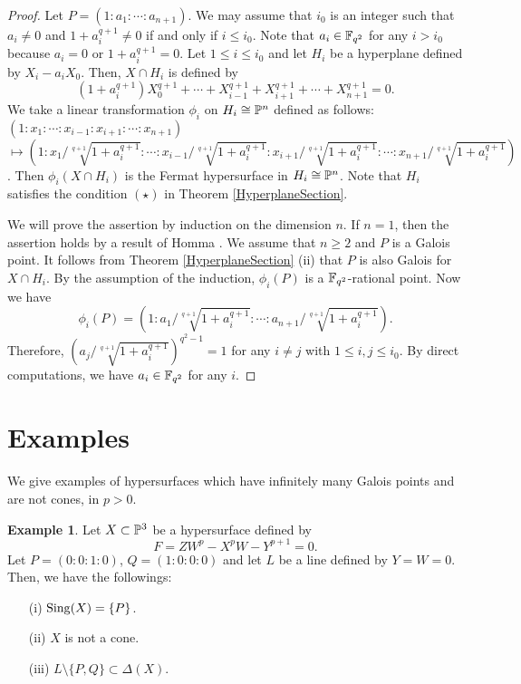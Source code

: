\documentclass[10pt,oneside]{amsart}
\theoremstyle{definition}
\newtheorem{example}{Example}
\begin{document}
\begin{proof}
Let $P=(1:a_1:\cdots:a_{n+1})$. 
We may assume that $i_0$ is an integer such that $a_i \ne 0$ and $1+a_i^{q+1} \ne 0$ if and only if $i \le i_0$. 
Note that $a_i \in \Bbb F_{q^2}$ for any $i > i_0$ because $a_i=0$ or $1+a_i^{q+1}=0$. 
Let $1 \le i \le i_0$ and let $H_i$ be a hyperplane defined by $X_i-a_iX_0$. 
Then, $X \cap H_i$ is defined by 
$$ (1+a_i^{q+1})X_0^{q+1}+\cdots+X_{i-1}^{q+1}+X_{i+1}^{q+1}+\cdots+X_{n+1}^{q+1}=0. $$
We take a linear transformation $\phi_i$ on $H_i \cong \Bbb P^{n}$ defined as follows: 
$(1:x_1:\cdots:x_{i-1}:x_{i+1}:\cdots:x_{n+1})$ 
$\mapsto (1:x_1/\sqrt[q+1]{1+a_i^{q+1}}:\cdots:x_{i-1}/\sqrt[q+1]{1+a_i^{q+1}}:x_{i+1}/\sqrt[q+1]{1+a_i^{q+1}}:\cdots:x_{n+1}/\sqrt[q+1]{1+a_i^{q+1}})$.  
Then $\phi_i(X \cap H_i)$ is the Fermat hypersurface in $H_i \cong \Bbb P^{n}$. 
Note that $H_i$ satisfies the condition $(\star)$ in Theorem \ref{HyperplaneSection}. 

We will prove the assertion by induction on the dimension $n$. 
If $n=1$, then the assertion holds by a result of Homma \cite{homma}. 
We assume that $n \ge 2$ and $P$ is a Galois point. 
It follows from Theorem \ref{HyperplaneSection} (ii) that $P$ is also Galois for $X \cap H_i$. 
By the assumption of the induction, $\phi_i(P)$ is a $\Bbb F_{q^2}$-rational point.  
Now we have 
$$ \phi_i(P)=(1:a_1/\sqrt[q+1]{1+a_i^{q+1}}:\cdots:a_{n+1}/\sqrt[q+1]{1+a_i^{q+1}}).$$ 
Therefore, $(a_j/\sqrt[q+1]{1+a_i^{q+1}})^{q^2-1}=1$ for any $i \ne j$ with $1 \le i, j \le i_0$. 
By direct computations, we have $a_i \in \Bbb F_{q^2}$ for any $i$. 
\end{proof}

\section{Examples} 

We give examples of hypersurfaces which have infinitely many Galois points and are not cones, in $p>0$. 

\begin{example} \label{example1} 
Let $X \subset \Bbb P^3$ be a hypersurface defined by 
$$ F=ZW^p-X^pW-Y^{p+1}=0. $$ 
Let $P=(0:0:1:0)$, $Q=(1:0:0:0)$ and let $L$ be a line defined by $Y=W=0$. 
Then, we have the followings: 
\begin{itemize}
\item[(i)] ${\rm Sing}(X)=\{P\}$. 
\item[(ii)] $X$ is not a cone. 
\item[(iii)] $L \setminus \{P, Q\} \subset \Delta(X)$. 
\end{itemize}
\end{example} 
\end{document}
